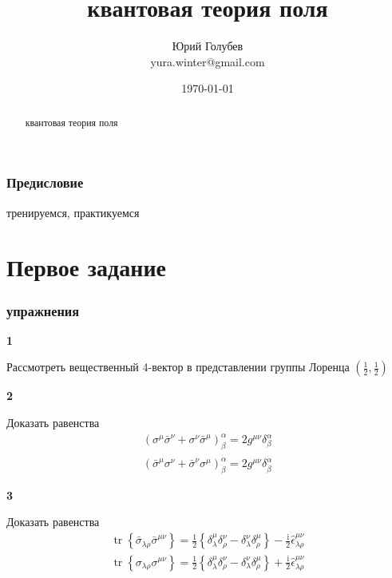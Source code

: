 \documentclass[a4paper,12pt]{article} %
\author{Юрий Голубев\\ yura.winter@gmail.com }
\title{квантовая теория поля}
\date{\today}
\begin{document}
\maketitle

\begin{abstract}
квантовая теория поля
\end{abstract}
\tableofcontents

\section*{Предисловие}

тренируемся, практикуемся


\clearpage
\part{Первое задание}


\section{упражнения}


\begin{task}\textbf{1}

Рассмотреть вещественный 4-вектор в представлении группы Лоренца $\left(\frac{1}{2}, \frac{1}{2}\right)$






\end{task}




\begin{task}\textbf{2}

Доказать равенства
$$
\begin{array}{l}
\left(\sigma^{\mu} \bar{\sigma}^{\nu}+\sigma^{\nu} \bar{\sigma}^{\mu}\right)_{\beta}^{\alpha}=2 g^{\mu \nu} \delta_{\beta}^{\alpha} \\
\left(\bar{\sigma}^{\mu} \sigma^{\nu}+\bar{\sigma}^{\nu} \sigma^{\mu}\right)_{\dot{\beta}}^{\dot{\alpha}}=2 g^{\mu \nu} \delta_{\dot{\beta}}^{\dot{\alpha}}
\end{array}
$$

\end{task}


\begin{task}\textbf{3}

Доказать равенства
$$
\begin{array}{l}
\operatorname{tr}\left\{\bar{\sigma}_{\lambda \rho} \bar{\sigma}^{\mu \nu}\right\}=\frac{1}{2}\left\{\delta_{\lambda}^{\mu} \delta_{\rho}^{\nu}-\delta_{\lambda}^{\nu} \delta_{\rho}^{\mu}\right\}-\frac{\mathrm{i}}{2} \hat{\epsilon}_{\lambda \rho}^{\mu \nu} \\
\operatorname{tr}\left\{\sigma_{\lambda \rho} \sigma^{\mu \nu}\right\}=\frac{1}{2}\left\{\delta_{\lambda}^{\mu} \delta_{\rho}^{\nu}-\delta_{\lambda}^{\nu} \delta_{\rho}^{\mu}\right\}+\frac{\mathrm{i}}{2} \hat{\epsilon}_{\lambda \rho}^{\mu \nu}
\end{array}
$$


\end{task}
\end{document}

